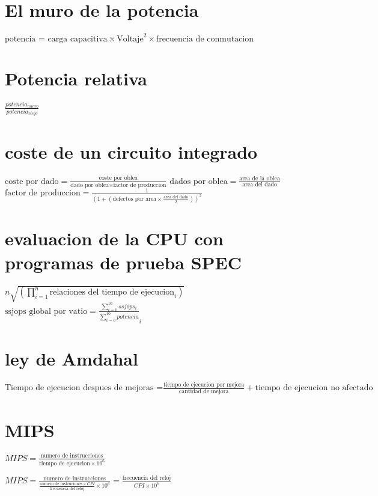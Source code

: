 \documentclass{article}
\begin{document}
\section{El muro de la potencia}
        \hbox{$\text{potencia = carga capacitiva}\times \text{Voltaje}^2\times \text{frecuencia de conmutacion}$}\vspace{8pt}
\section{Potencia relativa}
        \hbox{$\frac{potencia_{nuevo}}{potencia_{viejo}}$}\vspace{8pt}
\section{coste de un circuito integrado}
    \hbox{$\text{coste por dado}=\frac{\text{coste por oblea}}{\text{dado por oblea}\times\text{factor de produccion}}$}\vspace{8pt}
    \hbox{$\text{dados por oblea}=\frac{\text{area de la oblea}}{\text{area del dado}}$}\vspace{8pt}
    \hbox{$\text{factor de produccion}=\frac{1}{(1+(\text{defectos por area}\times \frac{\text{area del dado}}{2}))^2}$}\vspace{8pt}
\section{evaluacion de la CPU con programas de prueba SPEC}
    \hbox{$n\sqrt{(\prod_{i=1}^n\text{relaciones del tiempo de ejecucion}_{i})}$}\vspace{8pt}
    \hbox{$\text{ssjops global por vatio}=\frac{\sum_{i=0}^{10} ssjops_{i}}{\sum_{i=0}^{10} potencia}_{i}$} \vspace{8pt}
\section{ley de Amdahal}
    \hbox{$\text{Tiempo de ejecucion despues de mejoras =}\frac{\text{tiempo de ejecucion por mejora}}{\text{cantidad de mejora}}+\text{tiempo de ejecucion no afectado}$}\vspace{8pt}
\section{MIPS}
        \hbox{$MIPS = \frac{\text{numero de instrucciones}}{\text{tiempo de ejecucion}\times 10^6}$}\vspace{8pt}

        \hbox{$MIPS = \frac{\text{numero de instrucciones}}{\frac{\text{numero de instruciones} \times CPI}{\text{frecuencia del reloj}}\times 10^6}=\frac{\text{frecuencia del reloj}}{CPI\times 10^6}$}
        
\end{document}
